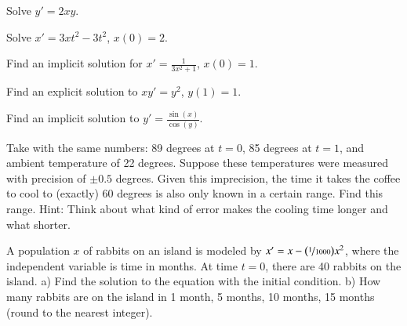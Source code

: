 \documentclass[12pt]{book}
\begin{document}
\setcounter{exercise}{100}

\begin{exercise}
Solve $y'=2xy$.
\end{exercise}

\begin{exercise}
Solve $x'=3xt^2-3t^2$, $x(0)=2$.
\end{exercise}

\begin{exercise}
Find an implicit solution for
$x'=\frac{1}{3x^2+1}$, $x(0)=1$.
\end{exercise}

\begin{exercise}
Find an explicit solution to $x y' = y^2$, $y(1) = 1$.
\end{exercise}

\begin{exercise}
Find an implicit solution to $y' = \frac{\sin(x)}{\cos(y)}$.
\end{exercise}

\begin{exercise}
Take  with the same numbers: 89 degrees at
$t=0$, 85 degrees at $t=1$, and ambient temperature
of 22 degrees.  Suppose these temperatures were measured with precision of
$\pm 0.5$ degrees.  Given this imprecision, the time
it takes the coffee to cool to (exactly) 60 degrees is also only known in a
certain range.  Find this range.  Hint: Think about what kind of error makes
the cooling time longer and what shorter.
\end{exercise}

\begin{exercise}
A population $x$ of rabbits on an island is modeled by
$x' = x- \bigl(\nicefrac{1}{1000} \bigr) x^2$, where the independent
variable is time in months.  At time $t=0$, there are 40 rabbits
on the island.  a) Find the solution to the equation with the initial
condition.  b) How many rabbits are on the island in 1 month, 5 months, 
10 months, 15 months (round to the nearest integer).
\end{exercise}

\end{document}
